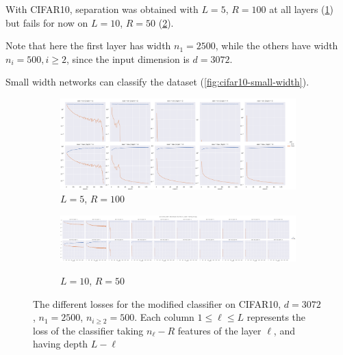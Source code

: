 \documentclass[a4paper]{article}
\begin{document}
With CIFAR10, separation was obtained with $L=5$, $R=100$ at all layers
(\cref{fig:cifar10-classifier-l5}) but fails for now on $L=10$, $R=50$
(\cref{fig:cifar10-classifier-l10}).

Note that here the first layer has width $n_1 = 2500$, while the others have
width $n_i = 500, i \geq 2$, since the input dimension is $d = 3072$.

Small width networks can classify the dataset (\cref{fig:cifar10-small-width}).

\begin{figure}[!ht]
    \centering
    \begin{subfigure}{\textwidth}
        \includegraphics[width=\textwidth]{cifar10/L_5_n1_2500_w_500_r_100}
        \caption{$L = 5$, $R = 100$}
        \label{fig:cifar10-classifier-l5}
    \end{subfigure}
    \begin{subfigure}{\textwidth}
        \centering
    \includegraphics[width=\textwidth]{cifar10/L_10_n1_2500_w_500_r_50}
    \label{fig:cifar10-classifier-l10}
    \caption{$L = 10$, $R = 50$}
\end{subfigure}
\caption{The different losses for the modified classifier on CIFAR10, $d =
    3072$, $n_1 = 2500$, $n_{i \geq 2} = 500$. Each column $1 \leq \ell \leq L$ represents the
    loss of the classifier taking $n_\ell - R$ features of the layer $\ell$, and
    having depth $L-\ell$ }
    \label{fig:cifar10-classifier}
\end{figure}
\end{document}
